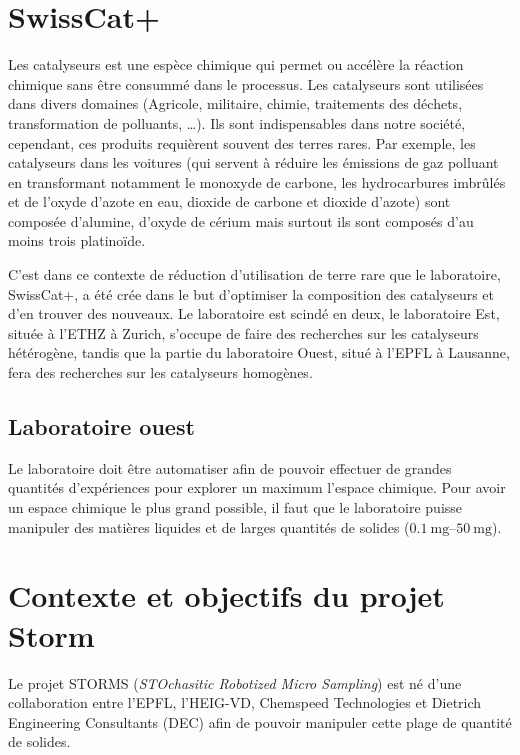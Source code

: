 \section{SwissCat+}
Les catalyseurs est une espèce chimique qui permet ou accélère la réaction chimique sans être consummé dans le processus. Les catalyseurs sont utilisées dans divers domaines (Agricole, militaire, chimie, traitements des déchets, transformation de polluants, \dots). Ils sont indispensables dans notre société, cependant, ces produits requièrent souvent des terres rares. Par exemple, les catalyseurs dans les voitures (qui servent à réduire les émissions de gaz polluant en transformant notamment le monoxyde de carbone, les hydrocarbures imbrûlés et de l'oxyde d'azote en eau, dioxide de carbone et dioxide d'azote) sont composée d'alumine, d'oxyde de cérium mais surtout ils sont composés d'au moins trois platinoïde.


C'est dans ce contexte de réduction d'utilisation de terre rare que le laboratoire, SwissCat+, a été crée dans le but d'optimiser la composition des catalyseurs et d'en trouver des nouveaux. Le laboratoire est scindé en deux, le laboratoire Est, située à l'ETHZ à Zurich, s'occupe de faire des recherches sur les catalyseurs hétérogène, tandis que la partie du laboratoire Ouest, situé à l'EPFL à Lausanne, fera des recherches sur les catalyseurs homogènes.
\subsection{Laboratoire ouest}
Le laboratoire doit être automatiser afin de pouvoir effectuer de grandes quantités d'expériences pour explorer un maximum l'espace chimique. Pour avoir un espace chimique le plus grand possible, il faut que le laboratoire puisse manipuler des matières liquides et de larges quantités de solides ($\qtyrange[range-units=single]{0.1}{50}{\mg} $).

\section{Contexte et objectifs du projet Storm}
Le projet STORMS (\textit{STOchasitic Robotized Micro Sampling}) est né d'une collaboration entre l'EPFL, l'HEIG-VD, Chemspeed Technologies et Dietrich Engineering Consultants (DEC) afin de pouvoir manipuler cette plage de quantité de solides.

